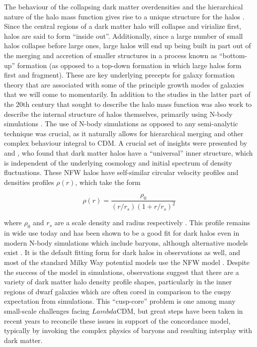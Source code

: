 The behaviour of the collapsing dark matter overdensities and the hierarchical nature of the halo mass function gives rise to a unique structure for the halos \parencite[e.g.][]{frenk85,frenk88}. Since the central regions of a dark matter halo will collapse and virialize first, halos are said to form ``inside out''. Additionally, since a large number of small halos collapse before large ones, large halos will end up being built in part out of the merging and accretion of smaller structures in a process known as ``bottom-up'' formation (as opposed to a top-down formation in which large halos form first and fragment). These are key underlying precepts for galaxy formation theory that are associated with some of the principle growth modes of galaxies that we will come to momentarily. In addition to the studies in the latter part of the 20th century that sought to describe the halo mass function was also work to describe the internal structure of halos themselves, primarily using N-body simulations \parencite[e.g.][]{efstathiou88,dubinski91}. The use of N-body simulations as opposed to any semi-analytic technique was crucial, as it naturally allows for hierarchical merging and other complex behaviour integral to CDM. A crucial set of insights were presented by \textcite{navarro96} and \textcite{navarro97}, who found that dark matter halos have a ``universal'' inner structure, which is independent of the underlying cosmology and initial spectrum of density fluctuations. These NFW halos have self-similar circular velocity profiles and densities profiles $\rho(r)$, which take the form

\begin{equation}
    \label{ch1:eq:nfw}
    \rho(r) = \frac{\rho_{0}}{(r/r_{s})(1 + r/r_{s})^{2}}
\end{equation}

\noindent where $\rho_{0}$ and $r_{s}$ are a scale density and radius respectively \parencite[note this is a special case of the density profile of ][with {$[\alpha,\beta]=[1,3]$}]{dehnen93}. This profile remains in wide use today and has been shown to be a good fit for dark halos even in modern N-body simulations which include baryons, although alternative models exist \parencite[e.g.][]{einasto65}. It is the default fitting form for dark halos in observations as well, and most of the standard Milky Way potential models use the NFW model \parencite[e.g.][]{bovy15,mcmillan17}. Despite the success of the model in simulations, observations suggest that there are a variety of dark matter halo density profile shapes, particularly in the inner regions of dwarf galaxies which are often cored in comparison to the cuspy expectation from simulations. This ``cusp-core'' problem \parencite[see][for a summary]{bullock17} is one among many small-scale challenges facing $Lambda$CDM, but great steps have been taken in recent years to reconcile these issues in support of the concordance model, typically by invoking the complex physics of baryons and resulting interplay with dark matter.

